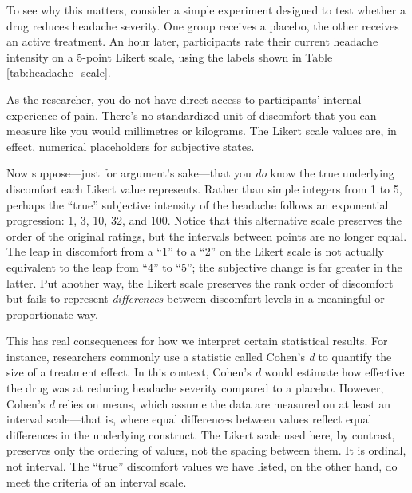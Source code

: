To see why this matters, consider a simple experiment designed to test whether a drug reduces headache severity. One group receives a placebo, the other receives an active treatment. An hour later, participants rate their current headache intensity on a 5-point Likert scale, using the labels shown in Table \ref{tab:headache_scale}.

\vspace{2em}



\vspace{1em}

\noindent
As the researcher, you do not have direct access to participants’ internal experience of pain. There's no standardized unit of discomfort that you can measure like you would millimetres or kilograms. The Likert scale values are, in effect, numerical placeholders for subjective states.

Now suppose—just for argument’s sake—that you \textit{do} know the true underlying discomfort each Likert value represents. Rather than simple integers from 1 to 5, perhaps the ``true'' subjective intensity of the headache follows an exponential progression: 1, 3, 10, 32, and 100. Notice that this alternative scale preserves the order of the original ratings, but the intervals between points are no longer equal. The leap in discomfort from a “1” to a “2” on the Likert scale is not actually equivalent to the leap from “4” to “5”; the subjective change is far greater in the latter. Put another way, the Likert scale preserves the rank order of discomfort but fails to represent \textit{differences} between discomfort levels in a meaningful or proportionate way.

This has real consequences for how we interpret certain statistical results. For instance, researchers commonly use a statistic called Cohen’s \textit{d} to quantify the size of a treatment effect. In this context, Cohen’s \textit{d} would estimate how effective the drug was at reducing headache severity compared to a placebo. However, Cohen’s \textit{d} relies on means, which assume the data are measured on at least an interval scale—that is, where equal differences between values reflect equal differences in the underlying construct. The Likert scale used here, by contrast, preserves only the ordering of values, not the spacing between them. It is ordinal, not interval. The ``true'' discomfort values we have listed, on the other hand, do meet the criteria of an interval scale.

